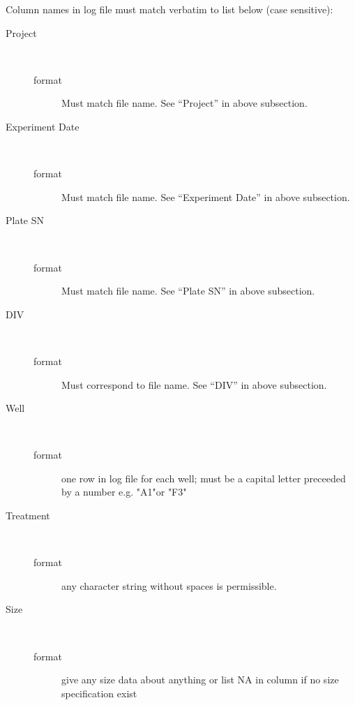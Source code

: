 \documentclass{article}\usepackage[]{graphicx}\usepackage[]{color}
\begin{document}
Column names in log file must match verbatim to list below (case sensitive):
\begin{description}
\item[Project] \mbox{}\\
\begin{description}
\item[format] Must match file name.  See ``Project'' in above subsection.
\end{description}

\item[Experiment Date] \mbox{}\\
\begin{description}
\item[format] Must match file name. See ``Experiment Date'' in above subsection.  
\end{description}

\item[Plate SN] \mbox{}\\
\begin{description}
\item[format] Must match file name. See ``Plate SN'' in above subsection.  
\end{description}


\item[DIV] \mbox{}\\
\begin{description}
\item[format] Must correspond to file name. See ``DIV'' in above subsection. 
\end{description}


\item[Well] \mbox{}\\
\begin{description}
\item[format] one row in log file for each well; must be a capital letter preceeded by a number e.g. "A1"or "F3" 
\end{description}

\item[Treatment] \mbox{}\\
\begin{description}
\item[format] any character string without spaces is permissible.
\end{description}

\item[Size] \mbox{}\\
\begin{description}
\item[format] give any size data about anything or list NA in column if no size specification exist 
\end{description}


\end{description}
\end{document}
